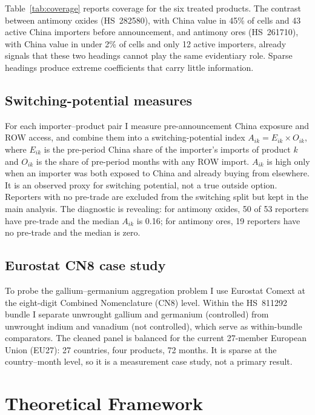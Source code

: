 \documentclass[12pt,a4paper]{article}
\begin{document}
Table~\ref{tab:coverage} reports coverage for the six treated products. The
contrast between antimony oxides (HS~282580), with China value in 45\% of cells
and 43 active China importers before announcement, and antimony ores
(HS~261710), with China value in under 2\% of cells and only 12 active
importers, already signals that these two headings cannot play the same
evidentiary role. Sparse headings produce extreme coefficients that carry little
information.



\subsection{Switching-potential measures}\label{sec:switchingdata}

For each importer--product pair I measure pre-announcement China exposure and
ROW access, and combine them into a switching-potential index
$A_{ik}=E_{ik}\times O_{ik}$, where $E_{ik}$ is the pre-period China share of
the importer's imports of product $k$ and $O_{ik}$ is the share of pre-period
months with any ROW import. $A_{ik}$ is high only when an importer was both
exposed to China and already buying from elsewhere. It is an observed proxy for
switching potential, not a true outside option. Reporters with no pre-trade are
excluded from the switching split but kept in the main analysis. The diagnostic
is revealing: for antimony oxides, 50 of 53 reporters have pre-trade and the
median $A_{ik}$ is 0.16; for antimony ores, 19 reporters have no pre-trade and
the median is zero.

\subsection{Eurostat CN8 case study}\label{sec:eurostatdata}

To probe the gallium--germanium aggregation problem I use Eurostat Comext at the
eight-digit Combined Nomenclature (CN8) level. Within the HS~811292 bundle I
separate unwrought gallium and germanium (controlled) from unwrought indium and
vanadium (not controlled), which serve as within-bundle comparators. The cleaned
panel is balanced for the current 27-member European Union (EU27): 27 countries,
four products, 72 months. It is sparse at the country--month level, so it is a
measurement case study, not a primary result.

\section{Theoretical Framework}\label{sec:framework}
\end{document}
